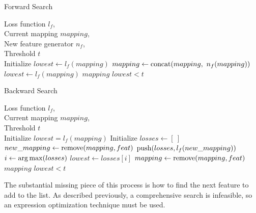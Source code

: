 \documentclass{article}
\begin{document}
\begin{algorithm}[tb]
   \caption{Forward Search}
   \label{alg:forwardsearch}
\begin{algorithmic}
    Loss function $l_f$, \\
   \quad \quad \quad Current mapping $mapping$, \\
   \quad \quad \quad New feature generator $n_f$, \\
   \quad \quad \quad Threshold $t$ \\
   \STATE Initialize $lowest \gets l_f(mapping)$
   \REPEAT
   \STATE $mapping \gets {\rm concat}(mapping, \ n_f(mapping))$
   \STATE $lowest \gets l_f(mapping)$
   \ELSE
    $mapping$
   \ENDIF
   \UNTIL $lowest < t$
\end{algorithmic}
\end{algorithm}

\begin{algorithm}[tb]
   \caption{Backward Search}
   \label{alg:backwardsearch}
\begin{algorithmic}
    Loss function $l_f$, \\
   \quad \quad \quad Current mapping $mapping$, \\
   \quad \quad \quad Threshold $t$ \\
   \STATE Initialize $lowest = l_f(mapping)$
   \REPEAT
   \STATE Initialize $losses \gets [ \ ]$
   \STATE $new\_mapping \gets {\rm remove}(mapping, feat)$
   \STATE ${\rm push}(losses, l_f(new\_mapping))$
   \ENDFOR
   \STATE $i \gets {\rm arg\,max}(losses)$
   \STATE $lowest \gets losses[i]$
   \STATE $mapping \gets {\rm remove}(mapping, feat)$
   \ELSE
    $mapping$
   \ENDIF
   \UNTIL $lowest < t$
\end{algorithmic}
\end{algorithm}

The substantial missing piece of this process is how to find the next feature to add to the list. As described previously, a comprehensive search is infeasible, so an expression optimization technique must be used.
\end{document}
